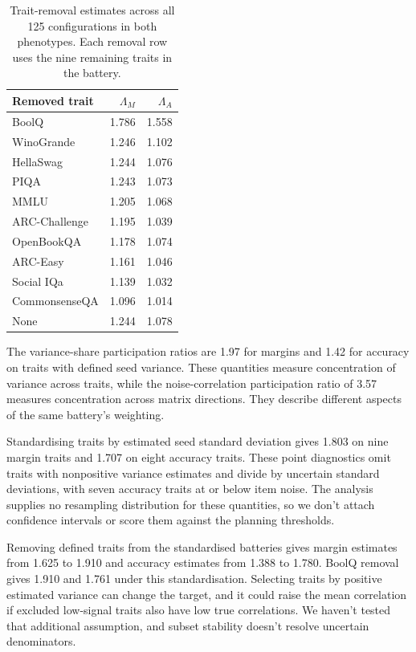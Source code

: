\begin{table}[htbp]
\centering\small
\caption{Trait-removal estimates across all 125 configurations in both phenotypes. Each removal row uses the nine remaining traits in the battery.}
\label{tab:original10}
\begin{tabular}{lrr}\hline
Removed trait & $\Lambda_M$ & $\Lambda_A$\\\hline
BoolQ & 1.786 & 1.558\\
WinoGrande & 1.246 & 1.102\\
HellaSwag & 1.244 & 1.076\\
PIQA & 1.243 & 1.073\\
MMLU & 1.205 & 1.068\\
ARC-Challenge & 1.195 & 1.039\\
OpenBookQA & 1.178 & 1.074\\
ARC-Easy & 1.161 & 1.046\\
Social IQa & 1.139 & 1.032\\
CommonsenseQA & 1.096 & 1.014\\
None & 1.244 & 1.078\\\hline
\end{tabular}
\end{table}

The variance-share participation ratios are 1.97 for margins and 1.42 for accuracy on traits with defined seed variance. These quantities measure concentration of variance across traits, while the noise-correlation participation ratio of 3.57 measures concentration across matrix directions. They describe different aspects of the same battery's weighting.

Standardising traits by estimated seed standard deviation gives 1.803 on nine margin traits and 1.707 on eight accuracy traits. These point diagnostics omit traits with nonpositive variance estimates and divide by uncertain standard deviations, with seven accuracy traits at or below item noise. The analysis supplies no resampling distribution for these quantities, so we don't attach confidence intervals or score them against the planning thresholds.

Removing defined traits from the standardised batteries gives margin estimates from 1.625 to 1.910 and accuracy estimates from 1.388 to 1.780. BoolQ removal gives 1.910 and 1.761 under this standardisation. Selecting traits by positive estimated variance can change the target, and it could raise the mean correlation if excluded low-signal traits also have low true correlations. We haven't tested that additional assumption, and subset stability doesn't resolve uncertain denominators.


